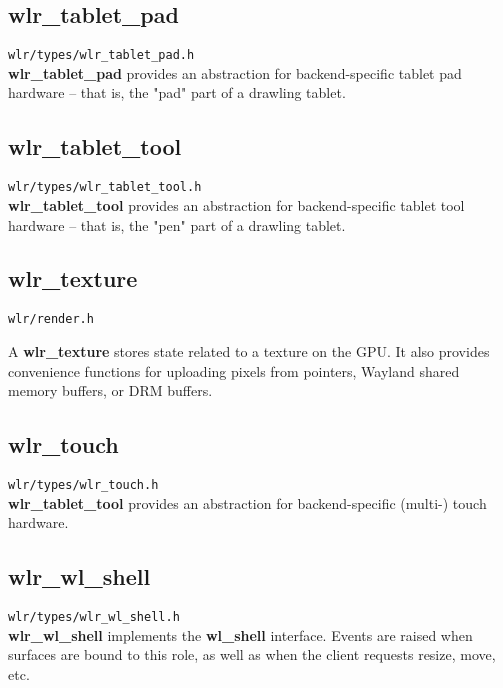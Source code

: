 \documentclass{article}
\newcommand{\code}[1]{\texttt{#1}}
\begin{document}
\subsection{wlr_tablet_pad}\label{wlr tablet pad}

\code{wlr/types/wlr_tablet_pad.h}\\

\textbf{wlr_tablet_pad} provides an abstraction for backend-specific tablet pad
hardware -- that is, the "pad" part of a drawling tablet.

\subsection{wlr_tablet_tool}\label{wlr tablet tool}

\code{wlr/types/wlr_tablet_tool.h}\\

\textbf{wlr_tablet_tool} provides an abstraction for backend-specific tablet
tool hardware -- that is, the "pen" part of a drawling tablet.

\subsection{wlr_texture}\label{wlr texture}

\code{wlr/render.h}

A \textbf{wlr_texture} stores state related to a texture on the GPU. It also
provides convenience functions for uploading pixels from pointers, Wayland
shared memory buffers, or DRM buffers.

\subsection{wlr_touch}\label{wlr touch}

\code{wlr/types/wlr_touch.h}\\

\textbf{wlr_tablet_tool} provides an abstraction for backend-specific (multi-)
touch hardware.

\subsection{wlr_wl_shell}\label{wlr wl shell}

\code{wlr/types/wlr_wl_shell.h}\\

\textbf{wlr_wl_shell} implements the \textbf{wl_shell} interface. Events are
raised when surfaces are bound to this role, as well as when the client requests
resize, move, etc.
\end{document}
